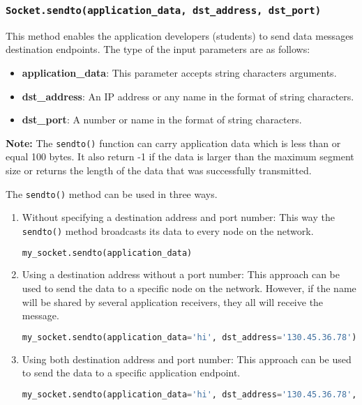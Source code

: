 \documentclass[11pt]{article}
\begin{document}
\subsubsection{\texttt{Socket.\textbf{sendto(application\_data, dst\_address, dst\_port)}}}
This method enables the application developers (students) to send data messages destination endpoints. The type of the input parameters are as follows:
\begin{itemize}
    \item \textbf{application\_data}: This parameter accepts string characters arguments.
    \item \textbf{dst\_address}: An IP address or any name in the format of string characters.
    \item \textbf{dst\_port}: A number or name in the format of string characters.
\end{itemize}

\textbf{Note:}
The \texttt{sendto()} function can carry application data which is less than or equal 100 bytes. It also return -1 if the data is larger than the maximum segment size or returns the length of the data that was successfully transmitted.

The \texttt{sendto()} method can be used in three ways.
\begin{enumerate}
    \item Without specifying a destination address and port number: This way the \texttt{sendto()} method broadcasts its data to every node on the network.
        \begin{lstlisting}[caption={}, language=Python]
my_socket.sendto(application_data)
        \end{lstlisting}

    \item Using a destination address without a port number: This approach can be used to send the data to a specific node on the network. However, if the name will be shared by several application receivers, they all will receive the message.
        \begin{lstlisting}[caption={}, language=Python]
my_socket.sendto(application_data='hi', dst_address='130.45.36.78')
        \end{lstlisting}

    \item Using both destination address and port number: This approach can be used to send the data to a specific application endpoint.
        \begin{lstlisting}[caption={}, language=Python]
my_socket.sendto(application_data='hi', dst_address='130.45.36.78', dst_port='app1')
        \end{lstlisting}
\end{enumerate}
\end{document}
